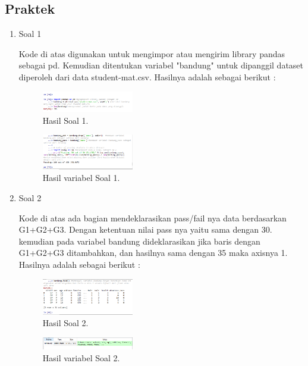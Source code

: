\subsection{Praktek}
\begin{enumerate}
	\item Soal 1
	\hfill\break
	
	Kode di atas digunakan untuk mengimpor atau mengirim library pandas sebagai pd. Kemudian ditentukan variabel "bandung" untuk dipanggil dataset diperoleh dari data student-mat.csv. Hasilnya adalah sebagai berikut :
	\begin{figure}[H]
	\centering
		\includegraphics[width=4cm]{figures/1174096/tugas2/2/hasil1.PNG}
		\caption{Hasil Soal 1.}
	\end{figure}
	\begin{figure}[H]
	\centering
		\includegraphics[width=4cm]{figures/1174096/tugas2/2/hasil1v.PNG}
		\caption{Hasil variabel Soal 1.}
	\end{figure}

	\item Soal 2
	\hfill\break
	
	Kode di atas ada bagian mendeklarasikan pass/fail nya data berdasarkan G1+G2+G3. Dengan ketentuan nilai pass nya yaitu sama dengan 30. kemudian pada variabel bandung dideklarasikan jika baris dengan G1+G2+G3 ditambahkan, dan hasilnya sama dengan 35 maka axisnya 1. Hasilnya adalah sebagai berikut :
	\begin{figure}[H]
	\centering
		\includegraphics[width=4cm]{figures/1174096/tugas2/2/hasil2.PNG}
		\caption{Hasil Soal 2.}
	\end{figure}
	\begin{figure}[H]
	\centering
		\includegraphics[width=4cm]{figures/1174096/tugas2/2/hasil2v.PNG}
		\caption{Hasil variabel Soal 2.}
	\end{figure}


\end{enumerate}
